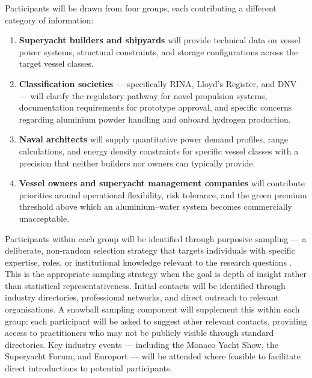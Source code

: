\documentclass[12pt]{article}
\begin{document}
Participants will be drawn from four groups, each contributing a different 
category of information:

\begin{enumerate}
    \item \textbf{Superyacht builders and shipyards} will provide technical data 
    on vessel power systems, structural constraints, and storage configurations 
    across the target vessel classes.

    \item \textbf{Classification societies} --- specifically RINA, Lloyd's 
    Register, and DNV --- will clarify the regulatory pathway for novel propulsion 
    systems, documentation requirements for prototype approval, and specific 
    concerns regarding aluminium powder handling and onboard hydrogen production.

    \item \textbf{Naval architects} will supply quantitative power demand profiles, 
    range calculations, and energy density constraints for specific vessel classes 
    with a precision that neither builders nor owners can typically provide.

    \item \textbf{Vessel owners and superyacht management companies} will contribute 
    priorities around operational flexibility, risk tolerance, and the green premium 
    threshold above which an aluminium--water system becomes commercially 
    unacceptable.
\end{enumerate}

Participants within each group will be identified through purposive sampling --- a 
deliberate, non-random selection strategy that targets individuals with specific 
expertise, roles, or institutional knowledge relevant to the research questions 
\cite{patton2002}. This is the appropriate sampling strategy when the goal is depth 
of insight rather than statistical representativeness. Initial contacts will be 
identified through industry directories, professional networks, and direct outreach 
to relevant organisations. A snowball sampling component will supplement this within 
each group: each participant will be asked to suggest other relevant contacts, 
providing access to practitioners who may not be publicly visible through standard 
directories. Key industry events --- including the Monaco Yacht Show, the Superyacht 
Forum, and Europort --- will be attended where feasible to facilitate direct 
introductions to potential participants.
\end{document}
